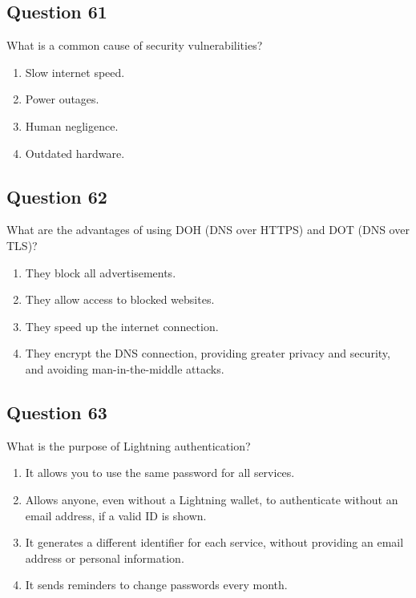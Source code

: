 \documentclass[12pt,a4paper]{article}
\begin{document}
\bigskip


\subsection*{Question 61}
What is a common cause of security vulnerabilities?

\begin{enumerate}[label=\Alph*., leftmargin=*]
\item Slow internet speed.
\item Power outages.
\item Human negligence.
\item Outdated hardware.
\end{enumerate}

\bigskip


\subsection*{Question 62}
What are the advantages of using DOH (DNS over HTTPS) and DOT (DNS over TLS)?

\begin{enumerate}[label=\Alph*., leftmargin=*]
\item They block all advertisements.
\item They allow access to blocked websites.
\item They speed up the internet connection.
\item They encrypt the DNS connection, providing greater privacy and security, and avoiding man-in-the-middle attacks.
\end{enumerate}

\bigskip


\subsection*{Question 63}
What is the purpose of Lightning authentication?

\begin{enumerate}[label=\Alph*., leftmargin=*]
\item It allows you to use the same password for all services.
\item Allows anyone, even without a Lightning wallet, to authenticate without an email address, if a valid ID is shown.
\item It generates a different identifier for each service, without providing an email address or personal information.
\item It sends reminders to change passwords every month.
\end{enumerate}
\end{document}

